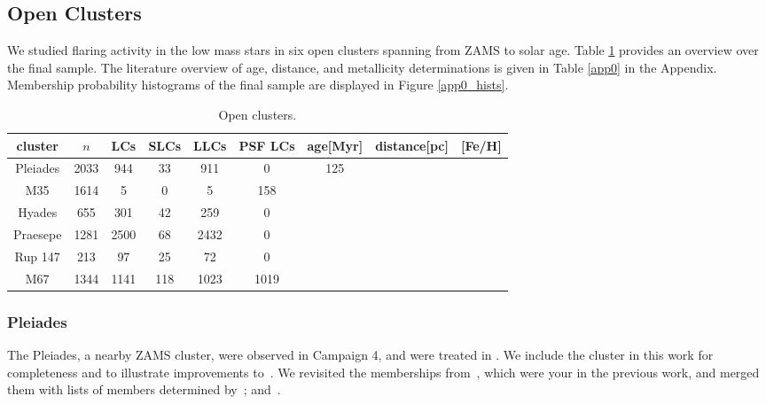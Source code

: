 \documentclass{aa}
\begin{document}
\subsection{Open Clusters}
We studied flaring activity in the low mass stars in six open clusters spanning from ZAMS to solar age. Table \ref{table_OCs} provides an overview over the final sample. The literature overview of age, distance, and metallicity determinations is given in Table \ref{app0} in the Appendix. Membership probability histograms of the final sample are displayed in Figure \ref{app0_hists}.
\begin{table}
\caption{Open clusters.}
\label{table_OCs}
\centering
\begin{tabular}{c c c c c c c c c }     %
\hline\hline
cluster & $n$ & LCs & SLCs & LLCs & PSF LCs & age[Myr] & distance[pc] & [Fe/H]\\
\hline
   Pleiades & 2033 & 944 & 33 & 911 &0&125 &&\\
   M35 & 1614 & 5 & 0 & 5 & 158 &&&\\
   Hyades &655 & 301 & 42 & 259 & 0&&&\\
   Praesepe & 1281 & 2500 & 68 & 2432 & 0&&&\\
   Rup 147 & 213 & 97 & 25 & 72 & 0&&& \\
   M67 & 1344 & 1141 & 118 & 1023 &1019 &&&\\
\hline
\end{tabular}
\end{table}
\subsubsection{Pleiades}
The Pleiades, a nearby ZAMS cluster, were observed in Campaign 4, and were treated in . We include the cluster in this work for completeness and to illustrate improvements to~. We revisited the memberships from~\citet{rebull_rotation_2016}, which were your in the previous work, and merged them with lists of members determined by~\citet{olivares_pleiades_2018, gaia_dr2_2018_hrd}; and~\citet{cantat_gaudin_2018}.
\end{document}
